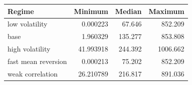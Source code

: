 \begin{tabular}{lrrr}
\toprule
Regime & Minimum & Median & Maximum \\
\midrule
low volatility & 0.000223 & 67.646 & 852.209 \\
base & 1.960329 & 135.277 & 853.808 \\
high volatility & 41.993918 & 244.392 & 1006.662 \\
fast mean reversion & 0.000213 & 75.202 & 852.209 \\
weak correlation & 26.210789 & 216.817 & 891.036 \\
\bottomrule
\end{tabular}
